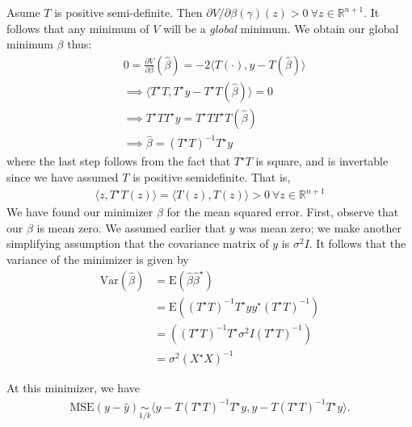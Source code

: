 \documentclass[12pt]{amsbook}
\newcommand{\rr}{\mathbb{R}}
\newcommand{\p}{\partial}
\newcommand{\e}{\mathrm{E}}
\newcommand{\mse}{\mathrm{MSE}}
\newcommand{\var}{\mathrm{Var}}
\theoremstyle{plain}
\theoremstyle{definition}
\theoremstyle{remark}
\numberwithin{equation}{section}  %
\numberwithin{equation}{section}  %
\begin{document}
Asume $T$ is positive semi-definite. Then $\p V/ \p \beta(\gamma)(z) > 0
\ \forall z \in \rr^{n+1}$. It follows that any minimum of $V$ will be a
\emph{global} minimum. We obtain our global minimum $\beta$ thus:
\begin{equation*}
\begin{split}
& 0 = \frac{\p V}{ \p \beta}(\hat{\beta}) = -2 \langle T(\cdot), y - T(\hat{\beta}) \rangle 
\\
& \implies  \langle T^{\star}T, T^{\star}y - T^{\star}T(\hat{\beta}) \rangle  = 0
\\
& \implies T^{\star}T T^{\star} y = T^{\star} T T^{\star} T(\hat{\beta})
\\
& \implies \hat{\beta} = (T^{\star}T)^{-1} T^{\star} y 
\end{split}
\end{equation*}
where the last step follows from the fact that $T^{\star}T$ is
square, and is invertable since we have assumed $T$ is positive semidefinite.
That is,
\begin{equation*}
\begin{split}
	\langle z, T^{\star}T(z) \rangle = \langle T(z), T(z) \rangle > 0 \ \forall
	z \in \rr^{n+1}  
\end{split}
\end{equation*}
We have found our minimizer $\beta$ for the mean squared error. First,
observe that our $\beta$ is mean zero. We assumed earlier that $y$ was
mean zero; we make another simplifying assumption that the covariance matrix of
$y$ is $\sigma^{2}I$. It follows that the variance of the minimizer is given by
\begin{equation*}
\begin{split}
	\var(\hat{\beta}) & = \e (\hat{\beta} \hat{\beta}^{\star})
	\\
	& = \e \left( (T^{\star}T)^{-1}T^{\star}y y^{\star}(T^{\star}T)^{-1} \right)
	\\
	& = \left( (T^{\star}T)^{-1}T^{\star}\sigma^{2}I(T^{\star}T)^{-1} \right)
	\\
	& = \sigma^{2} (X^{\star}X)^{-1}
\end{split}
\end{equation*}

At this minimizer, we have
\begin{equation*}
\begin{split}
	\mse(y - \hat{y}) \underset{1/k}{\sim} \langle y - T(T^{\star}T)^{-1} T^{\star}y, y -
	T(T^{\star}T)^{-1} T^{\star}y \rangle.
\end{split}
\end{equation*}
\end{document}
